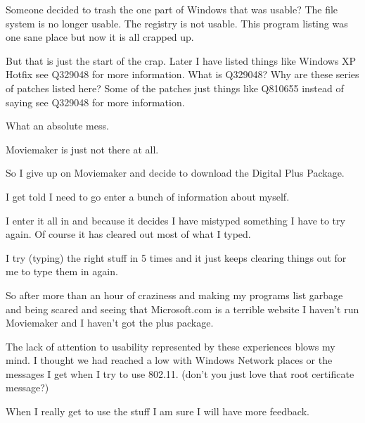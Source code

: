 \documentclass[letterpaper,10pt]{texMemo}
\begin{document}
Someone decided to trash the one part of Windows that was usable? The file system is no longer usable. The registry is not usable. This program listing was one sane place but now it is all crapped up.

But that is just the start of the crap. Later I have listed things like Windows XP Hotfix see Q329048 for more information. What is Q329048? Why are these series of patches listed here? Some of the patches just things like Q810655 instead of saying see Q329048 for more information.

What an absolute mess.

Moviemaker is just not there at all.

So I give up on Moviemaker and decide to download the Digital Plus Package.

I get told I need to go enter a bunch of information about myself.

I enter it all in and because it decides I have mistyped something I have to try again. Of course it has cleared out most of what I typed.

I try (typing) the right stuff in 5 times and it just keeps clearing things out for me to type them in again.

So after more than an hour of craziness and making my programs list garbage and being scared and seeing that Microsoft.com is a terrible website I haven't run Moviemaker and I haven't got the plus package.

The lack of attention to usability represented by these experiences blows my mind. I thought we had reached a low with Windows Network places or the messages I get when I try to use 802.11. (don't you just love that root certificate message?)

When I really get to use the stuff I am sure I will have more feedback.
\end{document}
